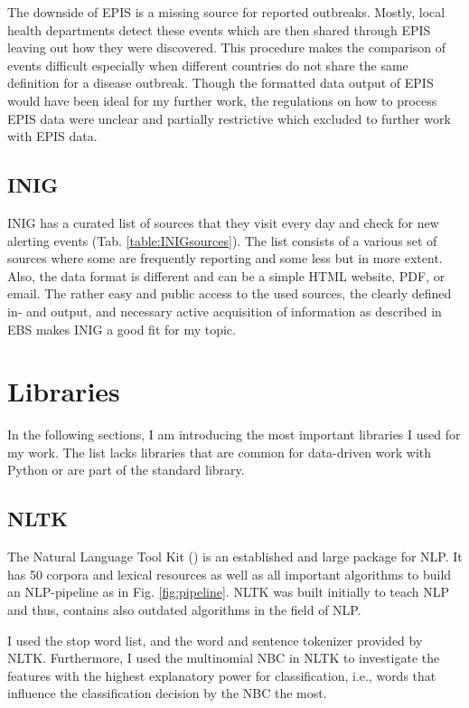   The downside of EPIS is a missing source for reported outbreaks.
  Mostly, local health departments detect these events which are then shared through EPIS leaving out how they were discovered.
  This procedure makes the comparison of events difficult especially when different countries do not share the same definition for a disease outbreak.
  Though the formatted data output of EPIS would have been ideal for my further work, the regulations on how to process EPIS data were unclear and partially restrictive which excluded to further work with EPIS data.

\subsection{INIG}\label{INIGsources}
  INIG has a curated list of sources that they visit every day and check for new alerting events (Tab. \ref{table:INIGsources}).
  The list consists of a various set of sources where some are frequently reporting and some less but in more extent.
  Also, the data format is different and can be a simple HTML website, PDF, or email.
  The rather easy and public access to the used sources, the clearly defined in- and output, and necessary active acquisition of information as described in EBS makes INIG a good fit for my topic.

\section{Libraries}
  In the following sections, I am introducing the most important libraries I used for my work.
  The list lacks libraries that are common for data-driven work with Python or are part of the standard library.

\subsection{NLTK}
  The Natural Language Tool Kit () is an established and large package for NLP.
  It has 50 corpora and lexical resources as well as all important algorithms to build an NLP-pipeline as in Fig. \ref{fig:pipeline}.
  NLTK was built initially to teach NLP and thus, contains also outdated algorithms in the field of NLP.

  I used the stop word list, and the word and sentence tokenizer provided by NLTK.
  Furthermore, I used the multinomial NBC in NLTK to investigate the features with the highest explanatory power for classification, i.e., words that influence the classification decision by the NBC the most.

